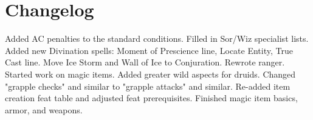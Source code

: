 \chapter{Changelog}
 Added AC penalties to the standard conditions. Filled in Sor/Wiz specialist lists. Added new Divination spells: Moment of Prescience line, Locate Entity, True Cast line. Move Ice Storm and Wall of Ice to Conjuration. Rewrote ranger.
 Started work on magic items. Added greater wild aspects for druids.
 Changed "grapple checks" and similar to "grapple attacks" and similar. Re-added item creation feat table and adjusted feat prerequisites. Finished magic item basics, armor, and weapons.
